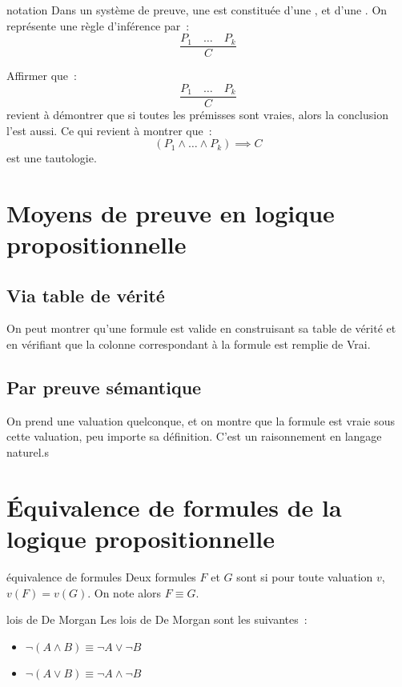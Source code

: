 \begin{definition}{}{notation}
    Dans un système de preuve, une  est constituée d'une , et d'une . On représente une règle d'inférence par~:
    $$\frac{P_1 \quad \dots \quad P_k}{C}$$
\end{definition}

\begin{remarque}{}{}
    Affirmer que~:
    $$\frac{P_1 \quad \dots \quad P_k}{C}$$
    revient à démontrer que si toutes les prémisses sont vraies, alors la conclusion l'est aussi. Ce qui revient à montrer que~:
    $$(P_1 \land \dots \land P_k) \implies C$$
    est une tautologie.
\end{remarque}

\section{Moyens de preuve en logique propositionnelle}

\subsection{Via table de vérité}
    On peut montrer qu'une formule est valide en construisant sa table de vérité et en vérifiant que la colonne correspondant à la formule est remplie de Vrai.
\subsection{Par preuve sémantique}
    On prend une valuation quelconque, et on montre que la formule est vraie sous cette valuation, peu importe sa définition. C'est un raisonnement en langage naturel.s
\section{Équivalence de formules de la logique propositionnelle}

\begin{definition}{}{équivalence de formules}
    Deux formules $F$ et $G$ sont  si pour toute valuation $v$, $v(F) = v(G)$. On note alors $F \equiv G$.
\end{definition}

\begin{proposition}{}{lois de De Morgan}
    Les lois de De Morgan sont les suivantes~:
    \begin{itemize}
        \item $\neg (A \land B) \equiv \neg A \lor \neg B$
        \item $\neg (A \lor B) \equiv \neg A \land \neg B$
    \end{itemize}
\end{proposition}

